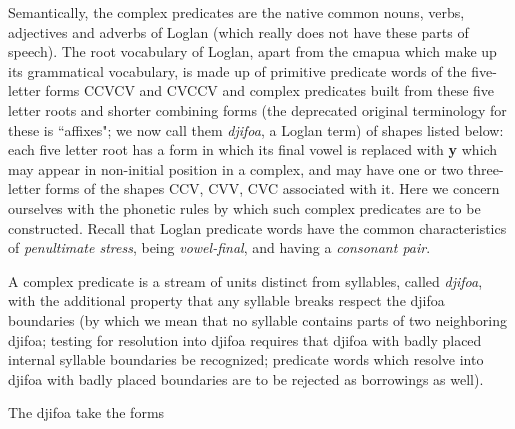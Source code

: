 \documentclass[12pt]{book}
\begin{document}
Semantically, the complex predicates are the native common nouns, verbs, adjectives and adverbs of Loglan (which really does not have these parts of speech).  The root vocabulary of Loglan, apart from the cmapua which make up its grammatical vocabulary, is made up of primitive predicate words of the
five-letter forms CCVCV and CVCCV and complex predicates built from these five letter roots and shorter combining forms (the deprecated original terminology for these is ``affixes";  we now call them {\em djifoa\/}, a Loglan term) of shapes listed below:  each five letter root has a form in which its final vowel is replaced with {\bf y} which may appear in non-initial position in a complex, and may have one or two three-letter forms of the shapes CCV, CVV, CVC associated with it.  Here we concern ourselves with the phonetic rules by which such complex predicates are to be constructed.  Recall that Loglan predicate words have the common characteristics of {\em penultimate stress}, being {\em vowel-final\/}, and having a {\em consonant pair\/}.

A complex predicate is a stream of units distinct from syllables, called {\em djifoa}, with the additional property that any syllable breaks respect the djifoa boundaries (by which we mean that no syllable contains parts of two neighboring djifoa;  testing for resolution into djifoa requires that djifoa with badly placed internal syllable boundaries be recognized; predicate words which resolve into djifoa with badly placed boundaries are to be rejected as borrowings as well). 

The djifoa take the forms
\end{document}
